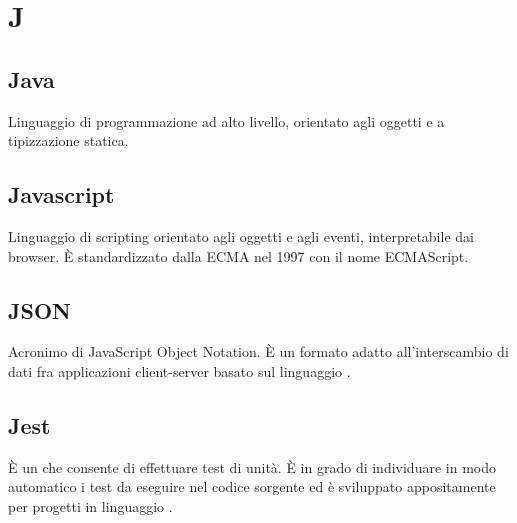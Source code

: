 \section*{J}
\markright{}

\subsection*{Java}
Linguaggio di programmazione ad alto livello, orientato agli oggetti e a tipizzazione statica.

\subsection*{Javascript}
Linguaggio di scripting orientato agli oggetti e agli eventi, interpretabile dai browser. È standardizzato dalla ECMA nel 1997 con il nome ECMAScript.

\subsection*{JSON}
Acronimo di JavaScript Object Notation. È un formato adatto all'interscambio di dati fra applicazioni client-server basato sul linguaggio .

\subsection*{Jest} 
È un  che consente di effettuare test di unità. È in grado di individuare in modo automatico i test da eseguire nel codice sorgente ed è sviluppato appositamente per progetti in linguaggio . 